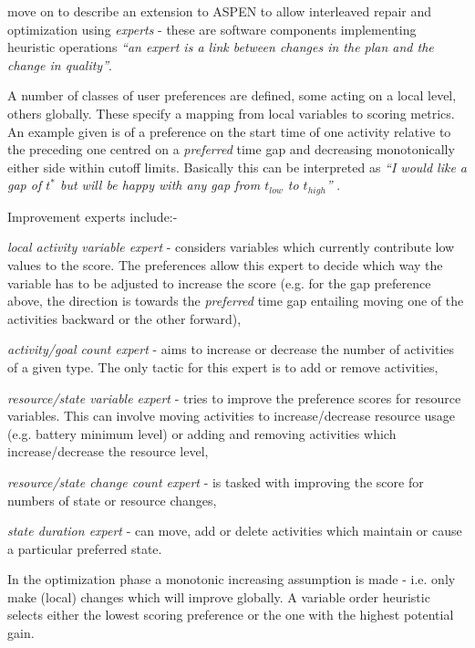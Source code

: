 \citet{rabideau00generic} move on to describe an extension to ASPEN to allow interleaved repair and optimization using \emph{experts} - these are software components implementing heuristic operations \emph{``an expert is a link between changes in the plan and the change in quality''}. 

A number of classes of user preferences are defined, some acting on a local level, others globally. These specify a mapping from local variables to scoring metrics. An example given is of a preference on the start time of one activity relative to the preceding one centred on a \emph{preferred} time gap and decreasing monotonically either side within cutoff limits. Basically this can be interpreted as \emph{``I would like a gap of $t^*$ but will be happy with any gap from $t_{low}$ to $t_{high}$''} . 

Improvement experts include:- \begin{inparaenum} \item \emph{local activity variable expert} - considers variables which currently contribute low values to the score. The preferences allow this expert to decide which way the variable has to be adjusted to increase the score (e.g. for the gap preference above, the direction is towards the \emph{preferred} time gap entailing moving one of the activities backward or the other forward), \item \emph{activity/goal count expert} - aims to increase or decrease the number of activities of a given type. The only tactic for this expert is to add or remove activities, \item \emph{resource/state variable expert} - tries to improve the preference scores for resource variables. This can involve moving activities to increase/decrease resource usage (e.g. battery minimum level) or adding and removing activities which increase/decrease the resource level, \item \emph{resource/state change count expert} - is tasked with improving the score for numbers of state or resource changes, \item \emph{state duration expert} - can move, add or delete activities which maintain or cause a particular preferred state.\end{inparaenum}

In the optimization phase a monotonic increasing assumption is made - i.e. only make (local) changes which will improve globally. A variable order heuristic selects either the lowest scoring preference or the one with the highest potential gain.

